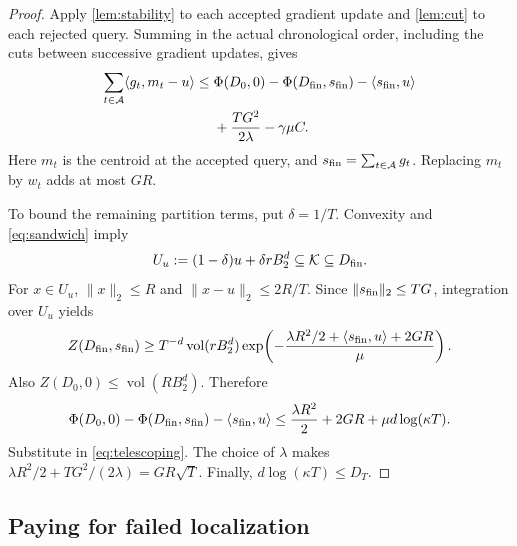 \documentclass[11pt]{article}
\newcommand{\K}{\mathcal K}
\newcommand{\vol}{\operatorname{vol}}
\newcommand{\ip}[2]{\langle #1,#2\rangle}
\newcommand{\norm}[1]{\lVert #1\rVert}
\theoremstyle{definition}
\begin{document}
\begin{proof}
Apply \cref{lem:stability} to each accepted gradient update and
\cref{lem:cut} to each rejected query. Summing in the actual chronological
order, including the cuts between successive gradient updates, gives
\begin{align}\label{eq:telescoping}
 \sum_{t\in\mathcal A}\ip{g_t}{m_t-u}
 \le{}&\Phi(D_0,0)-\Phi(D_{\rm fin},s_{\rm fin})
       -\ip{s_{\rm fin}}{u}\\
 &+\frac{TG^2}{2\lambda}-\gamma\mu C.\nonumber
\end{align}
Here $m_t$ is the centroid at the accepted query, and
$s_{\rm fin}=\sum_{t\in\mathcal A}g_t$.
Replacing $m_t$ by $w_t$ adds at most $GR$.

To bound the remaining partition terms, put $\delta=1/T$. Convexity and
\eqref{eq:sandwich} imply
\[
 U_u:=(1-\delta)u+\delta rB_2^d\subseteq\K\subseteq D_{\rm fin}.
\]
For $x\in U_u$, $\norm{x}_2\le R$ and $\norm{x-u}_2\le2R/T$.
Since $\norm{s_{\rm fin}}_2\le TG$, integration over $U_u$ yields
\[
 Z(D_{\rm fin},s_{\rm fin})
 \ge T^{-d}\vol(rB_2^d)
 \exp\!\left(-\frac{\lambda R^2/2+\ip{s_{\rm fin}}{u}+2GR}{\mu}\right).
\]
Also $Z(D_0,0)\le\vol(RB_2^d)$. Therefore
\[
 \Phi(D_0,0)-\Phi(D_{\rm fin},s_{\rm fin})-\ip{s_{\rm fin}}{u}
 \le\frac{\lambda R^2}{2}+2GR+\mu d\log(\kappa T).
\]
Substitute in \eqref{eq:telescoping}. The choice of $\lambda$ makes
$\lambda R^2/2+TG^2/(2\lambda)=GR\sqrt T$.
Finally, $d\log(\kappa T)\le D_T$.
\end{proof}

\subsection{Paying for failed localization}
\end{document}
